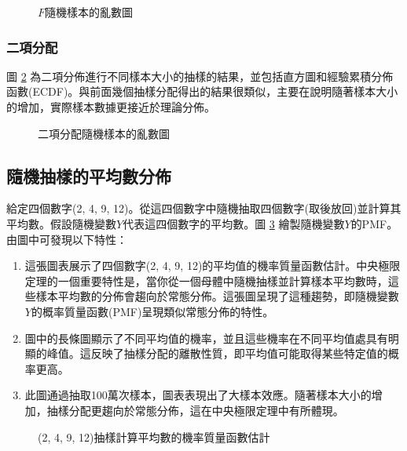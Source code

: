 \documentclass[12pt, a4paper]{article}
\begin{document}
\begin{figure}[H]
    \caption{$F$隨機樣本的亂數圖}
    \label{fig:F-distribution_sample}
\end{figure}
\subsubsection{二項分配}
圖 \ref{fig:binomial-distribution_sample} 為二項分佈進行不同樣本大小的抽樣的結果，並包括直方圖和經驗累積分佈函數(ECDF)。與前面幾個抽樣分配得出的結果很類似，主要在說明隨著樣本大小的增加，實際樣本數據更接近於理論分佈。
\begin{figure}[H]
    \caption{二項分配隨機樣本的亂數圖}
    \label{fig:binomial-distribution_sample}
\end{figure}

\subsection{隨機抽樣的平均數分佈}
給定四個數字(2, 4, 9, 12)。從這四個數字中隨機抽取四個數字(取後放回)並計算其平均數。假設隨機變數$Y$代表這四個數字的平均數。圖 \ref{fig:sampling-distribution_mean} 繪製隨機變數$Y$的PMF。由圖中可發現以下特性：
\begin{enumerate}
\item 這張圖表展示了四個數字(2, 4, 9, 12)的平均值的機率質量函數估計。中央極限定理的一個重要特性是，當你從一個母體中隨機抽樣並計算樣本平均數時，這些樣本平均數的分佈會趨向於常態分佈。這張圖呈現了這種趨勢，即隨機變數$Y$的概率質量函數(PMF)呈現類似常態分佈的特性。
\item 圖中的長條圖顯示了不同平均值的機率，並且這些機率在不同平均值處具有明顯的峰值。這反映了抽樣分配的離散性質，即平均值可能取得某些特定值的概率更高。
\item 此圖通過抽取100萬次樣本，圖表表現出了大樣本效應。隨著樣本大小的增加，抽樣分配更趨向於常態分佈，這在中央極限定理中有所體現。
\end{enumerate}

\begin{figure}[h]
    \caption{(2, 4, 9, 12)抽樣計算平均數的機率質量函數估計}
    \label{fig:sampling-distribution_mean}
\end{figure}
\end{document}
